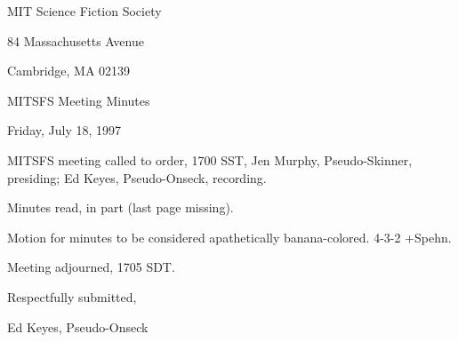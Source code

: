 \documentclass[12pt]{article}
\begin{document}
\begin{center}

MIT Science Fiction Society 

84 Massachusetts Avenue

Cambridge, MA 02139

\vspace{12pt}

MITSFS Meeting Minutes 

Friday, July 18, 1997

\end{center}
 
\vspace{18pt}

\setlength{\parskip}{6pt}

\noindent
MITSFS meeting called to order, 1700 SST,
Jen Murphy, Pseudo-Skinner, presiding; Ed Keyes, Pseudo-Onseck, recording.

Minutes read, in part (last page missing).

Motion for minutes to be considered apathetically banana-colored. 4-3-2 +Spehn.

\vspace{12pt}

\noindent
Meeting adjourned, 1705 SDT.

\vspace{18pt}

\centerline{Respectfully submitted,}
\centerline{Ed Keyes, Pseudo-Onseck}
\end{document}

